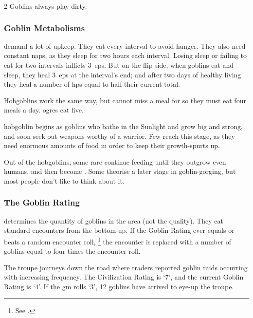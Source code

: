 \begin{multicols}{2}
Goblins always play dirty.


\subsubsection{Goblin Metabolisms}
\label{goblinMetabolisms}
demand a lot of upkeep.
They eat  every \gls{interval} to avoid hunger.
They also need constant naps, as they sleep for two hours each \gls{interval}.
Losing sleep or failing to eat for two \glspl{interval} inflicts 3~\glspl{ep}.
But on the flip side, when goblins eat  and sleep, they heal 3~\glspl{ep} at the \gls{interval}'s end;
and after two days of healthy living they heal a number of \glspl{hp} equal to half their current total.

Hobgoblins work the same way, but cannot miss a meal for  so they must eat four meals a day.
\Glspl{ogre} eat five.

  {hobgoblin}%
begins as goblins who bathe in the Sunlight and grow big and strong, and soon seek out weapons worthy of a warrior.
Few reach this stage, as they need enormous amounts of food in order to keep their growth-spurts up.

Out of the hobgoblins, some rare continue feeding until they outgrow even humans, and then become .
Some theorise a later stage in goblin-gorging, but most people don't like to think about it.


\subsubsection{The Goblin Rating}
\label{goblin_rating}
determines the quantity of goblins in the area (not the quality).
They eat standard encounters from the bottom-up.
If the Goblin Rating ever equals or beats a random encounter roll,%
\footnote{See .}
the encounter is replaced with a number of goblins equal to four times the encounter roll.

\begin{exampletext}
  The troupe journeys down the road where traders reported goblin raids occurring with increasing frequency.
  The Civilization Rating is `7', and the current Goblin Rating is `4'.
  If the \gls{gm} rolls `3', 12 goblins have arrived to eye-up the troupe.
\end{exampletext}


\end{multicols}
